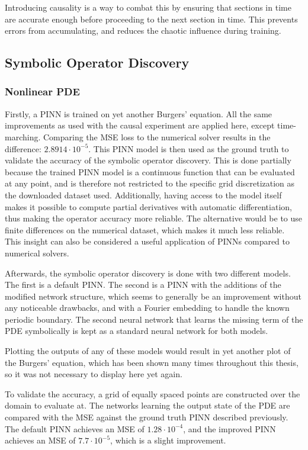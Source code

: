 Introducing causality is a way to combat this by ensuring that sections in time are accurate enough before proceeding to the next section in time. This prevents errors from accumulating, and reduces the chaotic influence during training.

\subsection{Symbolic Operator Discovery}

\subsubsection{Nonlinear PDE}

Firstly, a PINN is trained on yet another Burgers' equation. All the same improvements as used with the causal experiment are applied here, except time-marching. Comparing the MSE loss to the numerical solver results in the difference: $2.8914 \cdot 10^{-5}$. This PINN model is then used as the ground truth to validate the accuracy of the symbolic operator discovery. This is done partially because the trained PINN model is a continuous function that can be evaluated at any point, and is therefore not restricted to the specific grid discretization as the downloaded dataset used. Additionally, having access to the model itself makes it possible to compute partial derivatives with automatic differentiation, thus making the operator accuracy more reliable. The alternative would be to use finite differences on the numerical dataset, which makes it much less reliable. This insight can also be considered a useful application of PINNs compared to numerical solvers.

Afterwards, the symbolic operator discovery is done with two different models. The first is a default PINN. The second is a PINN with the additions of the modified network structure, which seems to generally be an improvement without any noticeable drawbacks, and with a Fourier embedding to handle the known periodic boundary. The second neural network that learns the missing term of the PDE symbolically is kept as a standard neural network for both models.

Plotting the outputs of any of these models would result in yet another plot of the Burgers' equation, which has been shown many times throughout this thesis, so it was not necessary to display here yet again.

To validate the accuracy, a grid of equally spaced points are constructed over the domain to evaluate at. The networks learning the output state of the PDE are compared with the MSE against the ground truth PINN described previously. The default PINN achieves an MSE of $1.28 \cdot 10^{-4}$, and the improved PINN achieves an MSE of $7.7 \cdot 10^{-5}$, which is a slight improvement.

